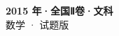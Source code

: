 \documentclass[zihao=-4, a4paper]{ctexart}
\begin{document}
\begin{center}
  {\Large\bfseries 2015 年·全国Ⅱ卷·文科}\\[4pt]
  {\large 数学 · 试题版}
\end{center}
\medskip
{}

\end{document}
